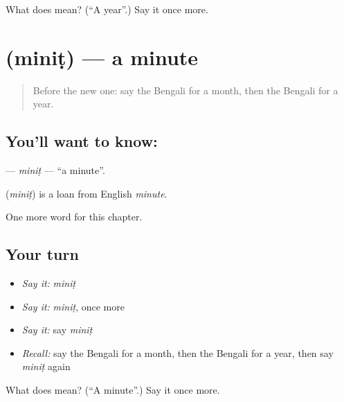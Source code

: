\begin{tcolorbox}[breakable,colback=teal!4,colframe=teal!35!black,title={Before you move on}]
What does  mean? (\textquotedblleft{}A year\textquotedblright{}.) Say it once more.
\end{tcolorbox}
\section[\texorpdfstring{\bn{মিনিট} (miniṭ)}{মিনিট (miniṭ)}]{ (miniṭ) — a minute}

\label{lesson:BN-C79-minit}



\begin{quote}
Before the new one: say the Bengali for a month, then the Bengali for a year.
\end{quote}

\subsection*{You'll want to know: }
\textbf{} — \emph{miniṭ} — \textquotedblleft{}a minute\textquotedblright{}.

\begin{cousinweb}
\textbf{} (\emph{miniṭ}) is a loan from English \emph{minute}.
\end{cousinweb}

\begin{grammarlens}[title={What you've built}]
One more word for this chapter.
\end{grammarlens}

\subsection*{Your turn}
\begin{itemize}
\raggedright
  \item \emph{Say it:} \emph{miniṭ}
  \item \emph{Say it:} \emph{miniṭ}, once more
  \item \emph{Say it:} say \emph{miniṭ}
  \item \emph{Recall:} say the Bengali for a month, then the Bengali for a year, then say \emph{miniṭ} again
\end{itemize}

\begin{tcolorbox}[breakable,colback=teal!4,colframe=teal!35!black,title={Before you move on}]
What does  mean? (\textquotedblleft{}A minute\textquotedblright{}.) Say it once more.
\end{tcolorbox}
